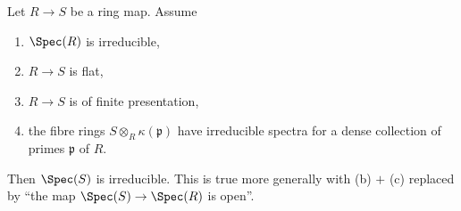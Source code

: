 \begin{lemma}
\label{lemma-flat-fibres-irreducible}
Let $R \to S$ be a ring map. Assume
\begin{enumerate}
\item[(a)] $\Spec(R)$ is irreducible,
\item[(b)] $R \to S$ is flat,
\item[(c)] $R \to S$ is of finite presentation,
\item[(d)] the fibre rings $S \otimes_R \kappa(\mathfrak p)$
have irreducible spectra for a dense collection of primes $\mathfrak p$ of $R$.
\end{enumerate}
Then $\Spec(S)$ is irreducible.
This is true more generally with (b) $+$ (c)
replaced by ``the map $\Spec(S) \to \Spec(R)$ is open''.
\end{lemma}

